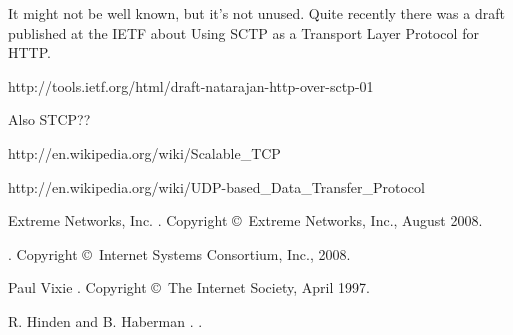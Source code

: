\documentclass[twoside]{article}
\begin{document}
It might not be well known, but it's not unused. Quite recently there was a draft published at the IETF about Using SCTP as a Transport Layer Protocol for HTTP.

http://tools.ietf.org/html/draft-natarajan-http-over-sctp-01



Also STCP??

http://en.wikipedia.org/wiki/Scalable_TCP

http://en.wikipedia.org/wiki/UDP-based_Data_Transfer_Protocol



\begin{thebibliography}{99}

   Extreme Networks, Inc.
   .
   \newblock Copyright \copyright~Extreme Networks, Inc., August 2008.\hfil\\

   .
   \newblock Copyright \copyright~Internet Systems Consortium, Inc., 2008.\hfil\\

   Paul Vixie
   .
   \newblock Copyright \copyright~The Internet Society, April 1997.\hfil\\

   R. Hinden and B. Haberman
   .
   .

\end{thebibliography}
\end{document}
